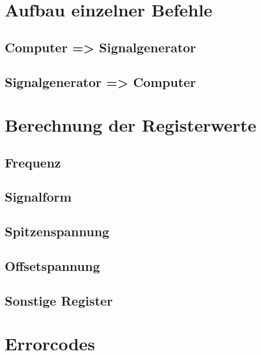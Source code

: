 \documentclass[a4paper,12pt]{article}
\begin{document}
\section{Aufbau einzelner Befehle}
\subsection{Computer => Signalgenerator}
\subsection{Signalgenerator => Computer}
\section{Berechnung der Registerwerte}
\subsection{Frequenz}
\subsection{Signalform}
\subsection{Spitzenspannung}
\subsection{Offsetspannung}
\subsection{Sonstige Register}
\section{Errorcodes}
\end{document}
